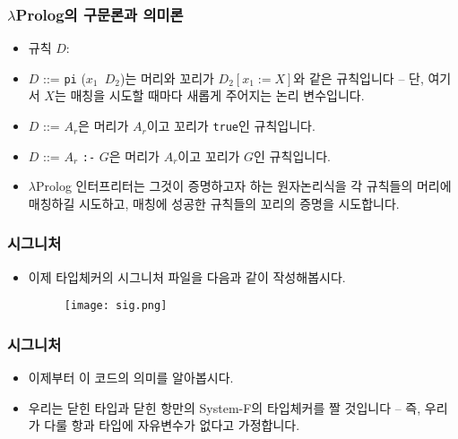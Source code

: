 \documentclass[slidestop,compress,mathserif]{beamer}
\begin{document}
    \begin{frame}
        \frametitle{$\lambda$Prolog의 구문론과 의미론}
        \begin{itemize}
            \item 규칙 $D$:
            \item $D$ ::= \texttt{pi} ($x_1$\texttt{\string\ }$D_2$)는 머리와 꼬리가 $D_2 \left[ x_1 := X \right]$와 같은 규칙입니다 -- 단, 여기서 $X$는 매칭을 시도할 때마다 새롭게 주어지는 논리 변수입니다.
            \item $D$ ::= $A_r$은 머리가 $A_r$이고 꼬리가 \texttt{true}인 규칙입니다.
            \item $D$ ::= $A_r$ \texttt{:-} $G$은 머리가 $A_r$이고 꼬리가 $G$인 규칙입니다.
            \item $\lambda$Prolog 인터프리터는 그것이 증명하고자 하는 원자논리식을 각 규칙들의 머리에 매칭하길 시도하고, 매칭에 성공한 규칙들의 꼬리의 증명을 시도합니다.
        \end{itemize}
    \end{frame}

    \begin{frame}
        \frametitle{시그니처}
        \begin{itemize}
            \item 이제 타입체커의 시그니처 파일을 다음과 같이 작성해봅시다.
            \begin{figure}[h]
                \begin{center}
                    \texttt{[image: sig.png]}
                \end{center}
            \end{figure}
        \end{itemize}
    \end{frame}

    \begin{frame}
        \frametitle{시그니처}
        \begin{itemize}
            \item 이제부터 이 코드의 의미를 알아봅시다.
            \item 우리는 닫힌 타입과 닫힌 항만의 System-F의 타입체커를 짤 것입니다 -- 즉, 우리가 다룰 항과 타입에 자유변수가 없다고 가정합니다.
        \end{itemize}
    \end{frame}
\end{document}
